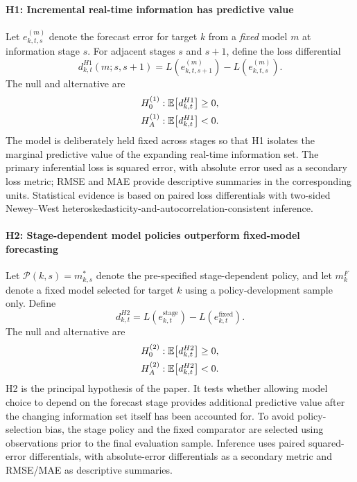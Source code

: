 \paragraph{H1: Incremental real-time information has predictive value}
Let $e_{k,t,s}^{(m)}$ denote the forecast error for target $k$ from a \emph{fixed} model $m$ at information stage $s$. For adjacent stages $s$ and $s+1$, define the loss differential
\begin{equation}
    d_{k,t}^{H1}(m;s,s+1)
    =
    L\!\left(e_{k,t,s+1}^{(m)}\right)
    -
    L\!\left(e_{k,t,s}^{(m)}\right).
    \label{eq:h1_loss_diff}
\end{equation}
The null and alternative are
\begin{align}
    H_{0}^{(1)} &: \mathbb{E}\!\left[d_{k,t}^{H1}\right] \geq 0,
    \label{eq:h1_null}\\
    H_{A}^{(1)} &: \mathbb{E}\!\left[d_{k,t}^{H1}\right] < 0.
    \label{eq:h1_alt}
\end{align}
The model is deliberately held fixed across stages so that H1 isolates the marginal predictive value of the expanding real-time information set. The primary inferential loss is squared error, with absolute error used as a secondary loss metric; RMSE and MAE provide descriptive summaries in the corresponding units. Statistical evidence is based on paired loss differentials with two-sided Newey--West heteroskedasticity-and-autocorrelation-consistent inference.

\paragraph{H2: Stage-dependent model policies outperform fixed-model forecasting}
Let $\mathcal{P}(k,s)=m^{*}_{k,s}$ denote the pre-specified stage-dependent policy, and let $m_k^{F}$ denote a fixed model selected for target $k$ using a policy-development sample only. Define
\begin{equation}
    d_{k,t}^{H2}
    =
    L\!\left(e_{k,t}^{\mathrm{stage}}\right)
    -
    L\!\left(e_{k,t}^{\mathrm{fixed}}\right).
    \label{eq:h2_loss_diff}
\end{equation}
The null and alternative are
\begin{align}
    H_{0}^{(2)} &: \mathbb{E}\!\left[d_{k,t}^{H2}\right] \geq 0,
    \label{eq:h2_null}\\
    H_{A}^{(2)} &: \mathbb{E}\!\left[d_{k,t}^{H2}\right] < 0.
    \label{eq:h2_alt}
\end{align}
H2 is the principal hypothesis of the paper. It tests whether allowing model choice to depend on the forecast stage provides additional predictive value after the changing information set itself has been accounted for. To avoid policy-selection bias, the stage policy and the fixed comparator are selected using observations prior to the final evaluation sample. Inference uses paired squared-error differentials, with absolute-error differentials as a secondary metric and RMSE/MAE as descriptive summaries.

